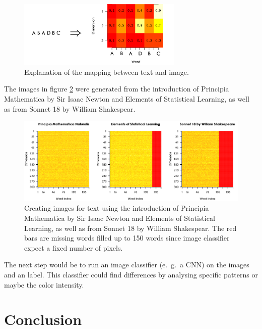 \begin{enumerate}
\begin{figure}[!h]
\centering
\includegraphics[width=0.7\textwidth]{images/image_classif.png} 
\caption[Example of the text to image procedure.]{Explanation of the mapping 
         between text and image.}
\label{fig:text-classif}
\end{figure}
\end{enumerate}



The images in figure \ref{fig:text-classif-images} were generated from the
introduction of Principia Mathematica by Sir Isaac Newton and Elements of 
Statistical Learning, as well as from Sonnet 18 by William Shakespear. \\

\begin{figure}[!h]
\centering
\includegraphics[width=\textwidth]{images/text_images.png} 
\caption[Specific text representation via images.]{Creating images for text using 
         the introduction of Principia Mathematica by Sir Isaac Newton and 
         Elements of Statistical Learning, as well as from Sonnet 18 by William 
         Shakespear. The red bars are missing words filled up to 150 words since 
         image classifier expect a fixed number of pixels.}
\label{fig:text-classif-images}
\end{figure}

The next step would be to run an image classifier (e.~g.~a CNN) on the images
and an label. This classifier could find differences by analysing specific patterns
or maybe the color intensity.

\section{Conclusion}

